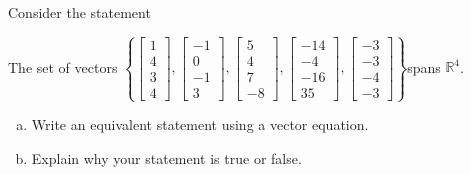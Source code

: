 
\begin{exerciseStatement}


Consider the statement 
\begin{center}\begin{minipage}{0.8\textwidth}
 The set of vectors \( \left\{ \left[\begin{array}{c}
1 \\
4 \\
3 \\
4
\end{array}\right] , \left[\begin{array}{c}
-1 \\
0 \\
-1 \\
3
\end{array}\right] , \left[\begin{array}{c}
5 \\
4 \\
7 \\
-8
\end{array}\right] , \left[\begin{array}{c}
-14 \\
-4 \\
-16 \\
35
\end{array}\right] , \left[\begin{array}{c}
-3 \\
-3 \\
-4 \\
-3
\end{array}\right] \right\} \)spans \(\mathbb{R}^4\). 
\end{minipage}\end{center}
    


\begin{enumerate}[(a)]
\item  Write an equivalent statement using a vector equation.
\item  Explain why your statement is true or false.
\end{enumerate}
    
\end{exerciseStatement}
    
